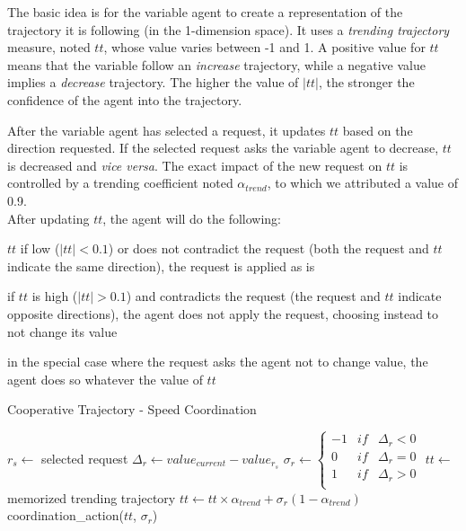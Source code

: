 The basic idea is for the variable agent to create a representation of the trajectory it is following (in the 1-dimension space). It uses a \emph{trending trajectory} measure, noted $tt$, whose value varies between -1 and 1. A positive value for $tt$ means that the variable follow an \emph{increase} trajectory, while a negative value implies a \emph{decrease} trajectory. The higher the value of $|tt|$, the stronger the confidence of the agent into the trajectory.

After the variable agent has selected a request, it updates $tt$ based on the direction requested. If the selected request asks the variable agent to decrease, $tt$ is decreased and \emph{vice versa}. The exact impact of the new request on $tt$ is controlled by a trending coefficient noted $\alpha_{trend}$, to which we attributed a value of 0.9.\\
After updating $tt$, the agent will do the following:
\begin{compactitem}
\item $tt$ if low ($|tt|< 0.1$) or does not contradict the request (both the request and $tt$ indicate the same direction), the request is applied as is
\item if $tt$ is high ($|tt|> 0.1$) and contradicts the request (the request and $tt$ indicate opposite directions), the agent does not apply the request, choosing instead to not change its value
\item in the special case where the request asks the agent not to change value, the agent does so whatever the value of $tt$
\end{compactitem}

\begin{algorithm}
\caption{Cooperative Trajectory - Speed Coordination}
\label{algo_speed_coordination}
	$r_s \leftarrow$ selected request\;
	\BlankLine
	$\Delta_r \leftarrow value_{current} - value_{r_{s}}$\;
	$\sigma_r \leftarrow \left\{
 									\begin{array}{rcr}
 									-1 & if &\Delta_r < 0 \\
 									0 & if &\Delta_r = 0\\ 										1 & if &\Delta_r > 0 \\
								\end{array}
								\right.$\;
	\BlankLine
	$tt \leftarrow$ memorized trending trajectory\;
	$tt \leftarrow tt \times \alpha_{trend}	+ \sigma_r(1 - \alpha_{trend})$\;
	\BlankLine
	coordination\_action($tt$, $\sigma_r$)	\;
\end{algorithm}


